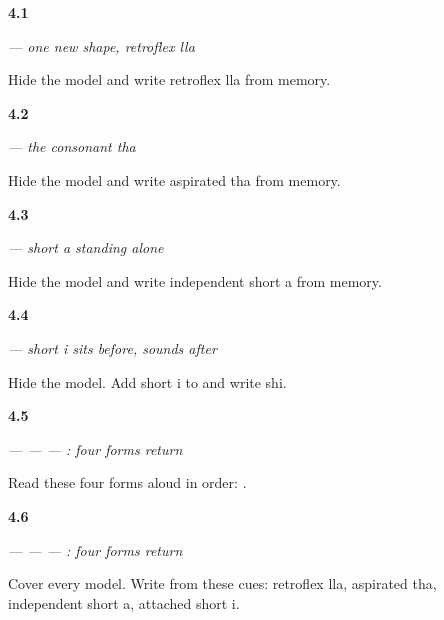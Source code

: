 \noindent\begin{minipage}[t]{\linewidth}
\raggedright
\hypertarget{review-GU-W04-lla-recall}{\textbf{4.1}} \emph{ — one new shape, retroflex lla}\par
\small Hide the model and write retroflex lla from memory.
\end{minipage}\par\medskip

\noindent\begin{minipage}[t]{\linewidth}
\raggedright
\hypertarget{review-GU-W04-tha-recall}{\textbf{4.2}} \emph{ — the consonant tha}\par
\small Hide the model and write aspirated tha from memory.
\end{minipage}\par\medskip

\noindent\begin{minipage}[t]{\linewidth}
\raggedright
\hypertarget{review-GU-W04-independent-a-recall}{\textbf{4.3}} \emph{ — short a standing alone}\par
\small Hide the model and write independent short a from memory.
\end{minipage}\par\medskip

\noindent\begin{minipage}[t]{\linewidth}
\raggedright
\hypertarget{review-GU-W04-i-matra-recall}{\textbf{4.4}} \emph{ — short i sits before, sounds after}\par
\small Hide the model. Add short i to  and write shi.
\end{minipage}\par\medskip

\noindent\begin{minipage}[t]{\linewidth}
\raggedright
\hypertarget{review-GU-R04-first-four-r1-reading}{\textbf{4.5}} \emph{ —  —  — : four forms return}\par
\small Read these four forms aloud in order:    .
\end{minipage}\par\medskip

\noindent\begin{minipage}[t]{\linewidth}
\raggedright
\hypertarget{review-GU-R04-first-four-r1-dictation}{\textbf{4.6}} \emph{ —  —  — : four forms return}\par
\small Cover every model. Write from these cues: retroflex lla, aspirated tha, independent short a, attached short i.
\end{minipage}\par\medskip

